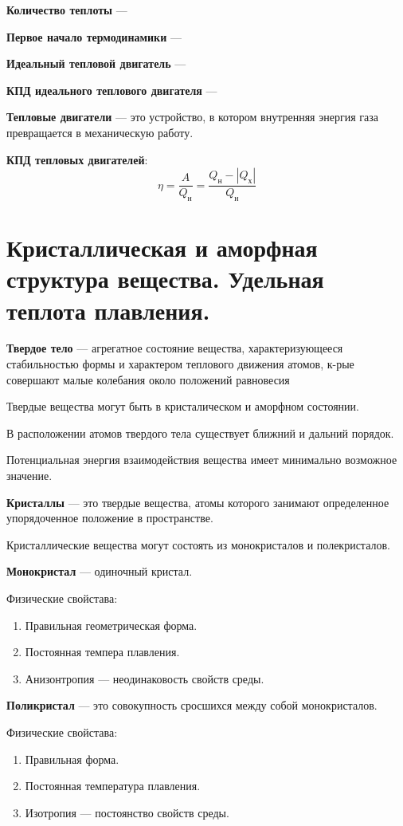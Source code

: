 \documentclass{report}
\begin{document}
{\bf Количество теплоты} ---

{\bf Первое начало термодинамики} ---

{\bf Идеальный тепловой двигатель} ---

{\bf КПД идеального теплового двигателя} ---

{\bf Тепловые двигатели} ---
это устройство, в котором внутренняя энергия газа превращается в механическую работу.

{\bf КПД тепловых двигателей}:
$$
\eta = \frac{A}{Q_\textrm{н}}=\frac{Q_\textrm{н}-\left|Q_\textrm{х}\right|}{Q_\textrm{н}}
$$



\part{Кристаллическая и аморфная структура вещества. 
Удельная теплота плавления.}

{\bf Твердое тело} ---
агрегатное состояние вещества, характеризующееся стабильностью формы и характером 
теплового движения атомов, к-рые совершают малые колебания около положений равновесия

Твердые вещества могут быть в кристалическом и аморфном состоянии.

В расположении атомов твердого тела существует ближний и дальний порядок.

Потенциальная энергия взаимодействия вещества имеет минимально возможное значение.

{\bf Кристаллы} ---
это твердые вещества, атомы которого занимают определенное упорядоченное положение в пространстве.

Кристаллические вещества могут состоять из монокристалов и полекристалов.

{\bf Монокристал} ---
одиночный кристал.

Физические свойстава:
\begin{enumerate}
  \item Правильная геометрическая форма.
  \item Постоянная темпера плавления.
  \item Анизонтропия --- неодинаковость свойств среды. 
\end{enumerate}

{\bf Поликристал} ---
это совокупность сросшихся между собой монокристалов.

Физические свойстава:
\begin{enumerate}
  \item Правильная форма.
  \item Постоянная температура плавления.
  \item Изотропия --- постоянство свойств среды.
\end{enumerate}
\end{document}
